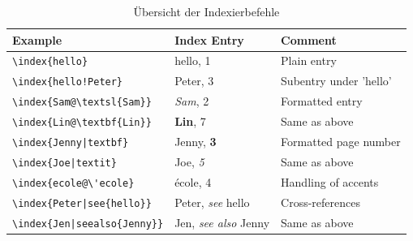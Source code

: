 \documentclass[11pt, a4paper,draft]{article}
\begin{document}
\begin{table}[h!]
\centering
\caption{Übersicht der Indexierbefehle\label{tab:Indexbefehle}}
\begin{tabular}{lll}
\toprule
Example &	Index Entry	 & Comment\\
\midrule
\verb+\index{hello}+ &	hello, 1	& Plain entry \\
\verb+\index{hello!Peter}+	&  Peter, 3	 &Subentry under 'hello'\\
\verb+\index{Sam@\textsl{Sam}}+&	\textsl{Sam}, 2	&Formatted entry\\
\verb+\index{Lin@\textbf{Lin}}	+&	\textbf{Lin}, 7	&Same as above\\
\verb+\index{Jenny|textbf}+&	Jenny, \textbf{3}	&Formatted page number\\
\verb+\index{Joe|textit}+&	Joe, \textit{5}	&Same as above\\
\verb+\index{ecole@\'ecole}+&	école, 4&	Handling of accents\\
\verb+\index{Peter|see{hello}}+&	Peter, \textit{see} hello	&Cross-references\\
\verb+\index{Jen|seealso{Jenny}}+ &	Jen, \textit{see also} Jenny	&Same as above\\
\bottomrule

\end{tabular}

\end{table}%

\newpage

\printbibliography
\printindex
\end{document}
